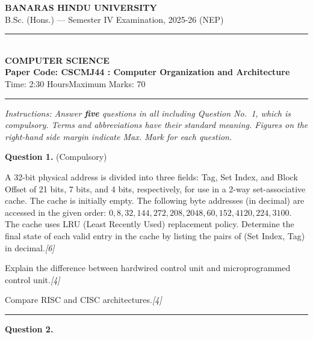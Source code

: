 \documentclass[11pt,a4paper]{article}
\newcommand{\pts}[1]{\hfill   \textit{[#1]}}
\begin{document}
\begin{center}
  {\large\bfseries BANARAS HINDU UNIVERSITY}\\[2pt]
  {\normalsize B.Sc. (Hons.) --- Semester IV Examination, 2025-26 (NEP)}\\[6pt]
  \rule{0.8\linewidth}{0.5pt}\\[6pt]
  {\large\bfseries COMPUTER SCIENCE}\\[4pt]
  {\large\bfseries Paper Code: CSCMJ44 : Computer Organization and Architecture}\\[4pt]
  {\normalsize Time: 2:30 Hours\hfill Maximum Marks: 70}
\end{center}

\rule{\linewidth}{0.4pt}

\smallskip



\noindent   \textit{Instructions: Answer   \textbf{five} questions in all including Question No.~1, which is compulsory. Terms and abbreviations have their standard meaning. Figures on the right-hand side margin indicate Max. Mark for each question.}

\bigskip




\noindent   \textbf{Question 1.} (Compulsory)

\begin{parts}
  \item A 32-bit physical address is divided into three fields: Tag, Set Index, and Block Offset of 21 bits, 7 bits, and 4 bits, respectively, for use in a 2-way set-associative cache. The cache is initially empty. The following byte addresses (in decimal) are accessed in the given order: $0, 8, 32, 144, 272, 208, 2048, 60, 152, 4120, 224, 3100$. The cache uses LRU (Least Recently Used) replacement policy. Determine the final state of each valid entry in the cache by listing the pairs of (Set Index, Tag) in decimal.\pts{6}
  \item Explain the difference between hardwired control unit and microprogrammed control unit.\pts{4}
  \item Compare RISC and CISC architectures.\pts{4}
\end{parts}

\medskip\rule{\linewidth}{0.2pt}\medskip




\noindent   \textbf{Question 2.}
\end{document}
